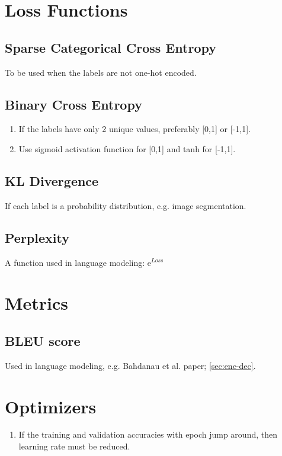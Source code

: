 \documentclass[a4paper, 12pt]{report}
\begin{document}
\chapter{Loss Functions}

\section{Sparse Categorical Cross Entropy}
To be used when the labels are not one-hot encoded.

\section{Binary Cross Entropy}
\begin{enumerate}
\item If the labels have only 2 unique values, preferably [0,1] or [-1,1].
\item Use sigmoid activation function for [0,1] and tanh for [-1,1].
\end{enumerate}

\section{KL Divergence}
If each label is a probability distribution, e.g. image segmentation.

\section{Perplexity}
A function used in language modeling: e$^{Loss}$

\chapter{Metrics}

\section{BLEU score}
Used in language modeling, e.g. {\color{green}Bahdanau et al. paper;  \autoref{sec:enc-dec}}.


\chapter{Optimizers}
\begin{enumerate}
\item If the training and validation accuracies with epoch jump around, then learning rate must be reduced.
\end{enumerate}
\end{document}
